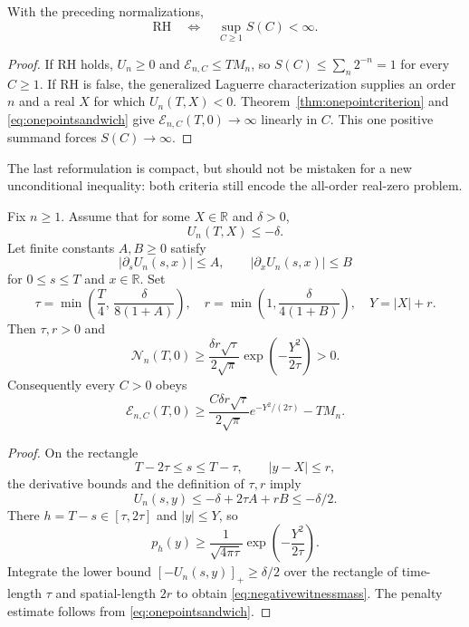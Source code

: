 \begin{corollary}
\label{cor:scalarpenalty}
With the preceding normalizations,
\[
\boxed{\quad
\mathrm{RH}
\quad\Longleftrightarrow\quad
\sup_{C\ge1} S(C)<\infty .
\quad}
\]
\end{corollary}
\begin{proof}
If RH holds, $U_n\ge0$ and
$\mathcal E_{n,C}\le TM_n$,
so $S(C)\le\sum_n2^{-n}=1$
for every $C\ge1$.
If RH is false, the generalized
Laguerre characterization supplies an
order $n$ and a real $X$ for which
$U_n(T,X)<0$.  Theorem~\ref{thm:onepointcriterion}
and \eqref{eq:onepointsandwich}
give $\mathcal E_{n,C}(T,0)\to\infty$
linearly in $C$.  This one
positive summand forces
$S(C)\to\infty$.
\end{proof}

The last reformulation is compact,
but should not be mistaken for a
new unconditional inequality:
both criteria still encode the
all-order real-zero problem.

\begin{theorem}\label{thm:negativewitness}
Fix $n\ge1$. Assume that for some
$X\in\mathbb R$ and $\delta>0$,
\[
U_n(T,X)\le-\delta.
\]
Let finite constants $A,B\ge0$
satisfy
\[
|\partial_sU_n(s,x)|\le A,\qquad
|\partial_xU_n(s,x)|\le B
\]
for $0\le s\le T$ and $x\in\mathbb R$.
Set
\[
\tau=\min\left(\frac T4,\,
\frac{\delta}{8(1+A)}\right),\quad
r=\min\left(1,\frac{\delta}{4(1+B)}\right),
\quad Y=|X|+r.
\]
Then $\tau,r>0$ and
\begin{equation}
\boxed{
\mathcal N_n(T,0)
\ge
\frac{\delta r\sqrt{\tau}}{2\sqrt\pi}
\exp\!\left(-\frac{Y^2}{2\tau}\right)>0.
}
\label{eq:negativewitnessmass}
\end{equation}
Consequently every $C>0$ obeys
\begin{equation}
\mathcal E_{n,C}(T,0)\ge
\frac{C\delta r\sqrt{\tau}}{2\sqrt\pi}
e^{-Y^2/(2\tau)}-TM_n.
\label{eq:negativewitnesspenalty}
\end{equation}
\end{theorem}
\begin{proof}
On the rectangle
\[
T-2\tau\le s\le T-\tau,\qquad
|y-X|\le r,
\]
the derivative bounds and the
definition of $\tau,r$ imply
\[
U_n(s,y)\le
-\delta+2\tau A+rB\le-\delta/2.
\]
There $h=T-s\in[\tau,2\tau]$ and
$|y|\le Y$, so
\[
p_h(y)\ge
\frac1{\sqrt{4\pi\tau}}
\exp\!\left(-\frac{Y^2}{2\tau}\right).
\]
Integrate the lower bound
$[-U_n(s,y)]_+\ge\delta/2$
over the rectangle of
time-length $\tau$ and
spatial-length $2r$ to obtain
\eqref{eq:negativewitnessmass}.
The penalty estimate follows from
\eqref{eq:onepointsandwich}.
\end{proof}

